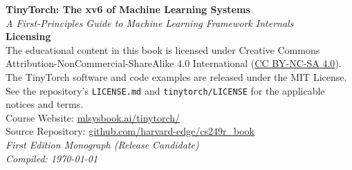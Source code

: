 
\begin{titlepage}

\thispagestyle{empty}
\clearpage

\thispagestyle{empty}
\vspace*{\fill}
\begin{flushleft}
{\fontsize{9}{13}\selectfont\color{bodygray!85}
\textbf{TinyTorch: The xv6 of Machine Learning Systems}\\
\textit{A First-Principles Guide to Machine Learning Framework Internals}\\
\vspace{1.2em}
\textbf{Licensing}\\
The educational content in this book is licensed under Creative Commons
Attribution-NonCommercial-ShareAlike 4.0 International
(\href{https://creativecommons.org/licenses/by-nc-sa/4.0/}{CC BY-NC-SA 4.0}).\\
\vspace{0.6em}
The TinyTorch software and code examples are released under the MIT License.
See the repository's \texttt{LICENSE.md} and \texttt{tinytorch/LICENSE}
for the applicable notices and terms.\\
\vspace{1.5em}
Course Website: \href{https://mlsysbook.ai/tinytorch/}{mlsysbook.ai/tinytorch/}\\
Source Repository: \href{https://github.com/harvard-edge/cs249r_book}{github.com/harvard-edge/cs249r\_book}\\
\vspace{1.5em}
\textit{First Edition Monograph (Release Candidate)}\\
\textit{Compiled: \today}
}
\end{flushleft}
\vspace{1.5cm}
\clearpage

\end{titlepage}
